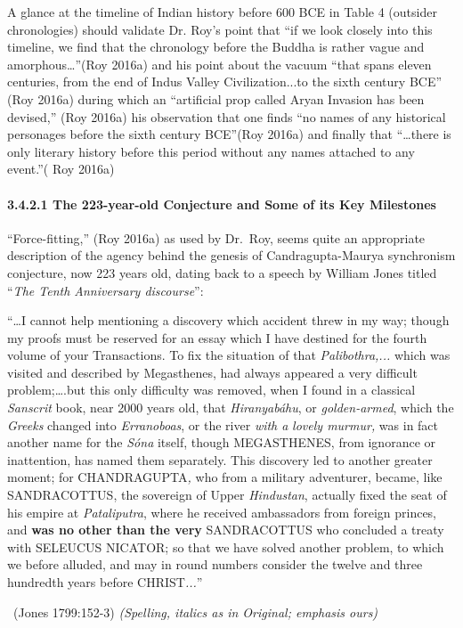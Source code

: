 A glance at the timeline of Indian history before 600 BCE in Table 4 (outsider chronologies) should validate Dr. Roy’s point that “if we look closely into this timeline, we find that the chronology before the Buddha is rather vague and amorphous…”(Roy 2016a) and his point about the vacuum “that spans eleven centuries, from the end of Indus Valley Civilization...to the sixth century BCE” (Roy 2016a) during which an “artificial prop called Aryan Invasion has been devised,” (Roy 2016a) his observation that one finds “no names of any historical personages before the sixth century BCE”(Roy 2016a) and finally that “…there is only literary history before this period without any names attached to any event.”( Roy 2016a)


\paragraph*{3.4.2.1 The 223-year-old Conjecture and Some of its Key Milestones}

“Force-fitting,” (Roy 2016a) as used by Dr.~Roy, seems quite an appropriate description of the agency behind the genesis of Candragupta-Maurya synchronism conjecture, now 223 years old, dating back to a speech by William Jones titled “\textit{The Tenth Anniversary discourse}”:

\begin{myquote}
“…I cannot help mentioning a discovery which accident threw in my way; though my proofs must be reserved for an essay which I have destined for the fourth volume of your Transactions. To fix the situation of that \textit{Palibothra,...} which was visited and described by Megasthenes, had always appeared a very difficult problem;….but this only difficulty was removed, when I found in a classical\textit{ Sanscrit} book, near 2000 years old, that \textit{Hiranyabáhu}, or \textit{golden-armed}, which the \textit{Greeks} changed into \textit{Erranoboas}, or the river \textit{with a} \textit{lovely murmur,} was in fact another name for the \textit{Sóna} itself, though MEGASTHENES, from ignorance or inattention, has named them separately. This discovery led to another greater moment; for CHANDRAGUPTA\textit{,} who from a military adventurer, became, like SANDRACOTTUS, the sovereign of Upper \textit{Hindustan}, actually fixed the seat of his empire at \textit{Pataliputra}, where he received ambassadors from foreign princes, and \textbf{was no other than the very} SANDRACOTTUS who concluded a treaty with SELEUCUS NICATOR; so that we have solved another problem, to which we before alluded, and may in round numbers consider the twelve and three hundredth years before CHRIST\textit{...}” 

~\hfill (Jones 1799:152-3) \textit{(Spelling, italics as in Original; emphasis ours)}
\end{myquote}

